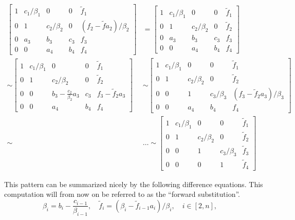 \documentclass[10pt, a4paper]{amsart}
\begin{document}
\begin{align}
\left[
\begin{array}{cccc|c}
1 & c_1/\beta_1 & 0 & 0 & \tilde{f}_1 \\
0 & 1 & c_2/\beta_2 & 0  & (f_2-\tilde{f}a_2)/\beta_2 \\
0 & a_3 & b_3 & c_3 & f_3 \\
0 & 0 & a_4 & b_4 & f_4
\end{array}
\right] &=
\left[
\begin{array}{cccc|c}
1 & c_1/\beta_1 & 0 & 0 & \tilde{f}_1 \\
0 & 1 & c_2/\beta_2 & 0  & \tilde{f}_2 \\
0 & a_3 & b_3 & c_3 & f_3 \\
0 & 0 & a_4 & b_4 & f_4
\end{array}
\right] \\ \sim 
\left[
\begin{array}{cccc|c}
1 & c_1/\beta_1 & 0 & 0 & \tilde{f}_1 \\
0 & 1 & c_2/\beta_2 & 0  & \tilde{f}_2 \\
0 & 0 & b_3-\frac{c_2}{\beta_2}a_3 & c_3 & f_3-\tilde{f}_2a_3 \\
0 & 0 & a_4 & b_4 & f_4
\end{array}
\right] &\sim 
\left[
\begin{array}{cccc|c}
1 & c_1/\beta_1 & 0 & 0 & \tilde{f}_1 \\
0 & 1 & c_2/\beta_2 & 0  & \tilde{f}_2 \\
0 & 0 & 1 & c_3/\beta_3 & (f_3-\tilde{f}_2a_3)/\beta_3 \\
0 & 0 & a_4 & b_4 & f_4
\end{array}\right] \\ 
\sim &\dots \sim
\left[
\begin{array}{cccc|c}
1 & c_1/\beta_1 & 0 & 0 & \tilde{f}_1 \\
0 & 1 & c_2/\beta_2 & 0  & \tilde{f}_2 \\
0 & 0 & 1 & c_3/\beta_3 & \tilde{f}_3 \\
0 & 0 & 0 & 1 & \tilde{f}_4
\end{array}
\right]
\end{align}

This pattern can be summarized nicely by the following
difference equations. This computation will from now on be referred to
as the ``forward substitution''. 
\begin{equation}
\beta_i=b_i-\frac{c_{i-1}}{\beta_{i-1}}, \quad
\tilde{f}_i=(\beta_i-\tilde{f}_{i-1}a_i)/\beta_i, \quad i \in [2,n], \quad
\end{equation}
\end{document}

